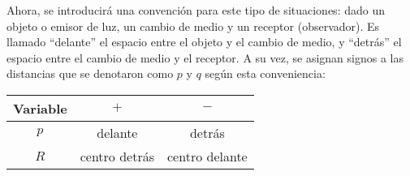 \begin{longderivation}
        \\
    \To\\
        \\
    \\
        \\
    \To\\
        \\
    \\ 
        \\
    \equiv\\
\end{longderivation}

Ahora, se introducirá una convención para este tipo de situaciones:
dado un objeto o emisor de luz, un cambio de medio y un receptor
(observador). Es  llamado ``delante'' el espacio entre el objeto y el
cambio de medio, y ``detrás'' el espacio entre el cambio de medio y el
receptor. A su vez, se asignan signos a las distancias que se denotaron
como $p$ y $q$ según esta conveniencia:

\begin{center}
    \begin{tabular}{ | c | c | c | } 
        \hline
        Variable    & $+$            & $-$\\ 
        \hline
        $p$         & delante        & detrás \\ 
        \hline
        $R$         & centro detrás  & centro delante\\ 
        \hline
      \end{tabular}
\end{center}
